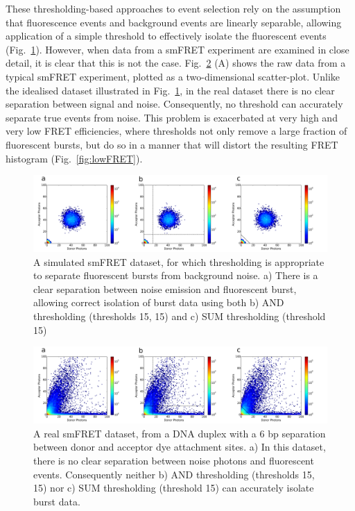 These thresholding-based approaches to event selection rely on the assumption that fluorescence events and background events are linearly separable, allowing application of a simple threshold to effectively isolate the fluorescent events (Fig.~\ref{fig:simulationscatter}). However, when data from a smFRET experiment are examined in close detail, it is clear that this is not the case. Fig.~\ref{fig:scatterDA} (A) shows the raw data from a typical smFRET experiment, plotted as a two-dimensional scatter-plot. Unlike the idealised dataset illustrated in Fig.~\ref{fig:simulationscatter}, in the real dataset there is no clear separation between signal and noise. Consequently, no threshold can accurately separate true events from noise. This problem is exacerbated at very high and very low FRET efficiencies, where thresholds not only remove a large fraction of fluorescent bursts, but do so in a manner that will distort the resulting FRET histogram (Fig.~\ref{fig:lowFRET}).

\begin{figure}
   \begin{center}
      \includegraphics*[clip=true, width=6in]{inference/thresholding_idealised.pdf}
      \caption{A simulated smFRET dataset, for which thresholding is appropriate to separate fluorescent bursts from background noise. a) There is a clear separation between noise emission and fluorescent burst, allowing correct isolation of burst data using both b) AND thresholding (thresholds 15, 15) and c) SUM thresholding (threshold 15)}
      \label{fig:simulationscatter}
   \end{center}
\end{figure}

\begin{figure}
   \begin{center}
      \includegraphics*[clip=true, width=6in]{inference/thresholding_real.pdf}
      \caption{A real smFRET dataset, from a DNA duplex with a 6 bp separation between donor and acceptor dye attachment sites. a) In this dataset, there is no clear separation between noise photons and fluorescent events. Consequently neither b) AND thresholding (thresholds 15, 15) nor c) SUM thresholding (threshold 15) can accurately isolate burst data.}
      \label{fig:scatterDA}
   \end{center}
\end{figure}

